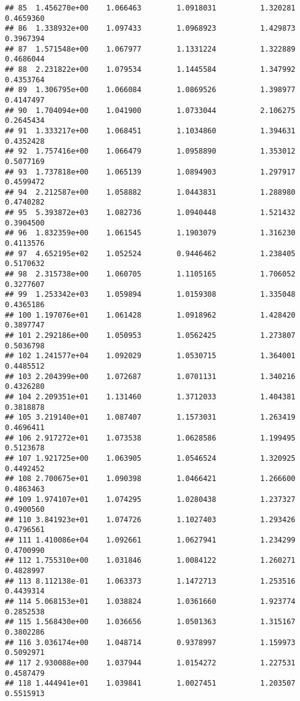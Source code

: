 \documentclass[]{article}
\begin{document}
\begin{verbatim}
## 85  1.456270e+00    1.066463        1.0918031          1.320281 0.4659360
## 86  1.338932e+00    1.097433        1.0968923          1.429873 0.3967394
## 87  1.571548e+00    1.067977        1.1331224          1.322889 0.4686044
## 88  2.231822e+00    1.079534        1.1445584          1.347992 0.4353764
## 89  1.306795e+00    1.066084        1.0869526          1.398977 0.4147497
## 90  1.704094e+00    1.041900        1.0733044          2.106275 0.2645434
## 91  1.333217e+00    1.068451        1.1034860          1.394631 0.4352428
## 92  1.757416e+00    1.066479        1.0958890          1.353012 0.5077169
## 93  1.737818e+00    1.065139        1.0894903          1.297917 0.4599472
## 94  2.212587e+00    1.058882        1.0443831          1.288980 0.4740282
## 95  5.393872e+03    1.082736        1.0940448          1.521432 0.3904500
## 96  1.832359e+00    1.061545        1.1903079          1.316230 0.4113576
## 97  4.652195e+02    1.052524        0.9446462          1.238405 0.5170632
## 98  2.315738e+00    1.060705        1.1105165          1.706052 0.3277607
## 99  1.253342e+03    1.059894        1.0159308          1.335048 0.4365186
## 100 1.197076e+01    1.061428        1.0918962          1.428420 0.3897747
## 101 2.292186e+00    1.050953        1.0562425          1.273807 0.5036798
## 102 1.241577e+04    1.092029        1.0530715          1.364001 0.4485512
## 103 2.204399e+00    1.072687        1.0701131          1.340216 0.4326280
## 104 2.209351e+01    1.131460        1.3712033          1.404381 0.3818878
## 105 3.219140e+01    1.087407        1.1573031          1.263419 0.4696411
## 106 2.917272e+01    1.073538        1.0628586          1.199495 0.5123678
## 107 1.921725e+00    1.063905        1.0546524          1.320925 0.4492452
## 108 2.700675e+01    1.090398        1.0466421          1.266600 0.4863463
## 109 1.974107e+01    1.074295        1.0280438          1.237327 0.4900560
## 110 3.841923e+01    1.074726        1.1027403          1.293426 0.4796561
## 111 1.410086e+04    1.092661        1.0627941          1.234299 0.4700990
## 112 1.755310e+00    1.031846        1.0084122          1.260271 0.4828997
## 113 8.112138e-01    1.063373        1.1472713          1.253516 0.4439314
## 114 5.068153e+01    1.038824        1.0361660          1.923774 0.2852538
## 115 1.568430e+00    1.036656        1.0501363          1.315167 0.3802286
## 116 3.036174e+00    1.048714        0.9378997          1.159973 0.5092971
## 117 2.930088e+00    1.037944        1.0154272          1.227531 0.4587479
## 118 1.444941e+01    1.039841        1.0027451          1.203507 0.5515913

\end{verbatim}
\end{document}
